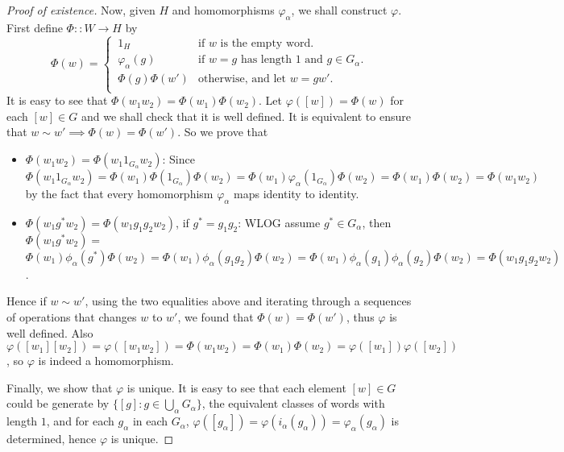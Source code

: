 \documentclass[a4paper]{article}
\theoremstyle{remark}
\theoremstyle{definition}
\theoremstyle{definition}
\theoremstyle{plain}
\begin{document}
\begin{proof}[Proof of existence]
    Now, given $H$ and homomorphisms $\varphi_\alpha$, we shall construct $\varphi$. First define 
    $\Phi :: W \to H$ by
    \[ 
      \Phi(w) =
      \begin{cases}
        \, 1_H & \text{if } w \text{ is the empty word.} \\
        \, \varphi_\alpha(g) & \text{if } w = g \text{ has length 1 and } g \in G_\alpha. \\ 
        \, \Phi(g) \Phi(w') & \text{otherwise, and let } w = g w'. \\ 
      \end{cases}
    \]
    It is easy to see that $\Phi(w_1 w_2) = \Phi(w_1) \Phi(w_2)$. Let $\varphi([w]) = \Phi(w)$ for
    each $[w] \in G$ and we shall check that it is well defined. It is equivalent to
    ensure that $w \sim w' \implies \Phi(w) = \Phi(w')$. So we prove that
    \begin{itemize}
      \item $\Phi(w_1 w_2) = \Phi(w_1 1_{G_\alpha} w_2)$: Since $\Phi(w_1 1_{G_\alpha} w_2) 
        = \Phi(w_1) \Phi(1_{G_\alpha}) \Phi(w_2) = \Phi(w_1) \varphi_\alpha(1_{G_\alpha}) \Phi(w_2)
        = \Phi(w_1) \Phi(w_2) = \Phi(w_1 w_2)$ by the fact that every homomorphism $\varphi_\alpha$ maps
        identity to identity.
      \item $\Phi(w_1 g^* w_2) = \Phi(w_1 g_1 g_2 w_2)$, if $g^* = g_1 g_2$: WLOG assume $g^* \in G_\alpha$, then 
        $\Phi(w_1 g^* w_2) = $ \\
        $ \Phi(w_1) \phi_\alpha(g^*) \Phi(w_2) = \Phi(w_1) \phi_\alpha(g_1 g_2) \Phi(w_2)
        = \Phi(w_1) \phi_\alpha(g_1) \phi_\alpha(g_2) \Phi(w_2) = \Phi(w_1 g_1 g_2 w_2)$. 
    \end{itemize}
    Hence if $w \sim w'$, using the two equalities above and iterating through a sequences of
    operations that changes $w$ to $w'$, we found that $\Phi(w) = \Phi(w')$, thus $\varphi$ is
    well defined. Also $\varphi([w_1][w_2]) = \varphi([w_1 w_2]) = \Phi(w_1 w_2) = \Phi(w_1) \Phi(w_2)
    = \varphi([w_1]) \varphi([w_2])$, so $\varphi$ is indeed a homomorphism.

    Finally, we show that $\varphi$ is unique. It is easy to see that each element
    $[w] \in G$ could be generate by $\big\{[g] : g \in \bigcup_\alpha G_\alpha\big\}$,
    the equivalent classes of words with length $1$, 
    and for each $g_\alpha$ in each $G_\alpha$, $\varphi([g_\alpha]) = \varphi(i_\alpha(g_\alpha)) =
    \varphi_\alpha(g_\alpha)$ is determined, hence $\varphi$ is unique.
  \end{proof}
\end{document}
